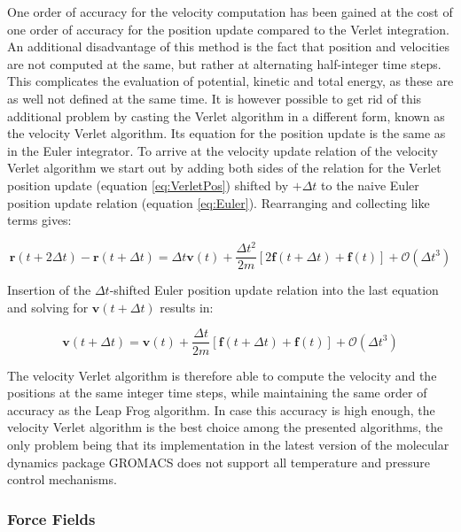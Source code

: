 \documentclass[english, a4paper, 12pt, titlepage, draft]{article}
\newcommand{\vect}[1]{\mathbf{#1}}
\newcommand{\vfun}[2]{\vect{#1}\left(#2\right)}
\begin{document}
One order of accuracy for the velocity computation has been gained at the cost of one order of accuracy for the position update compared to the Verlet integration.
An additional disadvantage of this method is the fact that position and velocities are not computed at the same, but rather at alternating half-integer time steps.
This complicates the evaluation of potential, kinetic and total energy, as these are as well not defined at the same time.
It is however possible to get rid of this additional problem by casting the Verlet algorithm in a different form, known as the velocity Verlet algorithm.
Its equation for the position update is the same as in the Euler integrator.
To arrive at the velocity update relation of the velocity Verlet algorithm we start out by adding both sides of the relation for the Verlet position update (equation \ref{eq:VerletPos}) shifted by $+\Delta t$ to the naive Euler position update relation (equation \ref{eq:Euler}).
Rearranging and collecting like terms gives:

\begin{equation}
    \vfun{r}{t+2\Delta t} - \vfun{r}{t+\Delta t} = \Delta t \vfun{v}{t} + \frac{\Delta t^2}{2m} \left[ 2\vfun{f}{t+\Delta t} + \vfun{f}{t} \right] + \mathcal{O}(\Delta t^3)
\end{equation}

Insertion of the $\Delta t$-shifted Euler position update relation into the last equation and solving for $\vfun{v}{t+\Delta t}$ results in:

\begin{equation}
    \vfun{v}{t+\Delta t} = \vfun{v}{t} + \frac{\Delta t}{2m} \left[ \vfun{f}{t+\Delta t} + \vfun{f}{t}\right]  + \mathcal{O}(\Delta t^3)
\end{equation}

The velocity Verlet algorithm is therefore able to compute the velocity and the positions at the same integer time steps, while maintaining the same order of accuracy as the Leap Frog algorithm.
In case this accuracy is high enough, the velocity Verlet algorithm is the best choice among the presented algorithms, the only problem being that its implementation in the latest version of the molecular dynamics package GROMACS does not support all temperature and pressure control mechanisms.


\subsubsection{Force Fields}
\label{sec:forcefields}
\end{document}
